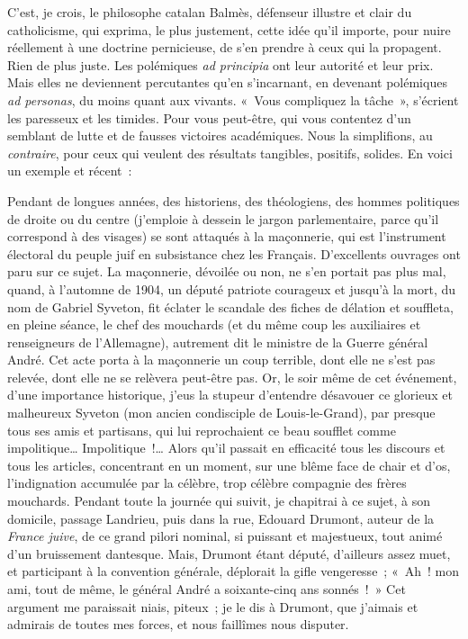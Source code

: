 \documentclass[french,twoside]{book} %
\begin{document}
C’est, je crois, le philosophe catalan Balmès, défenseur illustre et clair du catholicisme, qui exprima, le plus justement, cette idée qu’il importe, pour nuire réellement à une doctrine pernicieuse, de s’en prendre à ceux qui la propagent. Rien de plus juste. Les polémiques {\itshape ad principia} ont leur autorité et leur prix. Mais elles ne deviennent percutantes qu’en s’incarnant, en devenant polémiques {\itshape ad personas}, du moins quant aux vivants. « Vous compliquez la tâche », s’écrient les paresseux et les timides. Pour vous peut-être, qui vous contentez d’un semblant de lutte et de fausses victoires académiques. Nous la simplifions, au {\itshape contraire}, pour ceux qui veulent des résultats tangibles, positifs, solides. En voici un exemple et récent :\par
Pendant de longues années, des historiens, des théologiens, des hommes politiques de droite ou du centre (j’emploie à dessein le jargon parlementaire, parce qu’il correspond à des visages) se sont attaqués à la maçonnerie, qui est l’instrument électoral du peuple juif en subsistance chez les Français. D’excellents ouvrages ont paru sur ce sujet. La maçonnerie, dévoilée ou non, ne s’en portait pas plus mal, quand, à l’automne de 1904, un député patriote courageux et jusqu’à la mort, du nom de Gabriel Syveton, fit éclater le scandale des fiches de délation et souffleta, en pleine séance, le chef des mouchards (et du même coup les auxiliaires et renseigneurs de l’Allemagne), autrement dit le ministre de la Guerre général André. Cet acte porta à la maçonnerie un coup terrible, dont elle ne s’est pas relevée, dont elle ne se relèvera peut-être pas. Or, le soir même de cet événement, d’une importance historique, j’eus la stupeur d’entendre désavouer ce glorieux et malheureux Syveton (mon ancien condisciple de Louis-le-Grand), par presque tous ses amis et partisans, qui lui reprochaient ce beau soufflet comme impolitique… Impolitique !… Alors qu’il passait en efficacité tous les discours et tous les articles, concentrant en un moment, sur une blême face de chair et d’os, l’indignation accumulée par la célèbre, trop célèbre compagnie des frères mouchards. Pendant toute la journée qui suivit, je chapitrai à ce sujet, à son domicile, passage Landrieu, puis dans la rue, Edouard Drumont, auteur de la {\itshape France juive}, de ce grand pilori nominal, si puissant et majestueux, tout animé d’un bruissement dantesque. Mais, Drumont étant député, d’ailleurs assez muet, et participant à la convention générale, déplorait la gifle vengeresse ; « Ah ! mon ami, tout de même, le général André a soixante-cinq ans sonnés ! » Cet argument me paraissait niais, piteux ; je le dis à Drumont, que j’aimais et admirais de toutes mes forces, et nous faillîmes nous disputer.\par
\end{document}
